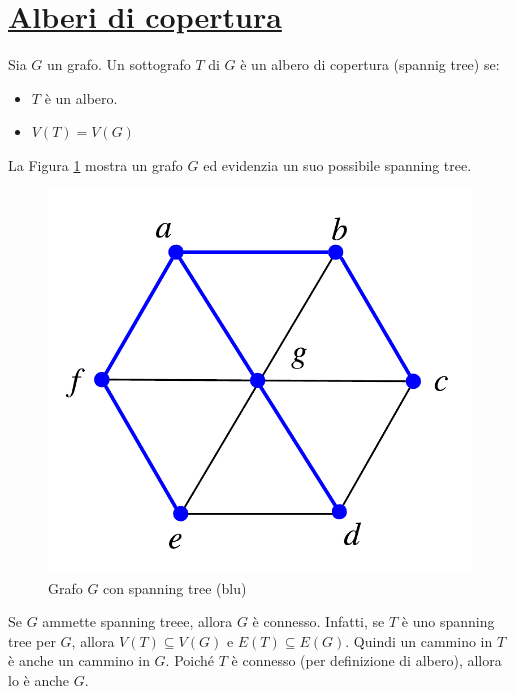 \section{\underline{Alberi di copertura}}
\begin{tcolorbox}[colback=yellow!30, colframe=yellow!30!black, title=Albero di copertura]
Sia $G$ un grafo. Un sottografo $T$ di $G$ è un albero di copertura (spannig tree) se:
\begin{itemize}
\item $T$ è un albero.
\item $V(T)=V(G)$
\end{itemize}
\end{tcolorbox}

La Figura \ref{spanning} mostra un grafo $G$ ed evidenzia un suo possibile
spanning tree.

\begin{figure}[H]
\centering
\includegraphics[scale = 0.6]{figures/spanningtree.pdf}
\caption{Grafo $G$ con spanning tree (blu)}
\label{spanning}
\end{figure}

\begin{osservaz}
Se $G$ ammette spanning treee, allora $G$ è connesso. Infatti, se
$T$ è uno spanning tree per $G$, allora $V(T)\subseteq V(G)$ e
$E(T)\subseteq E(G)$. Quindi un cammino in $T$ è anche un cammino
in $G$. Poiché $T$ è connesso (per definizione di albero), allora
lo è anche $G$.
\end{osservaz}

